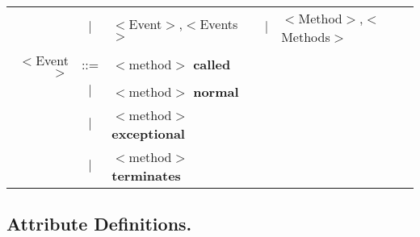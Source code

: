 {\begin{longtable}{rclrcl}
              & $\mid$ & $<$Event$>$,$<$Events$>$ &
              & $\mid$ & $<$Method$>$,$<$Methods$>$\medskip\\

$<$Event$>$ & ::=      & $<$method$>$ \textbf{called}\\
            & $\mid$ & $<$method$>$ \textbf{normal}\\
            & $\mid$ & $<$method$>$ \textbf{exceptional}\\
            & $\mid$ & $<$method$>$ \textbf{terminates}%

\end{longtable}
}

\subsection{Attribute Definitions.}
\label{Appendix-atribute}

